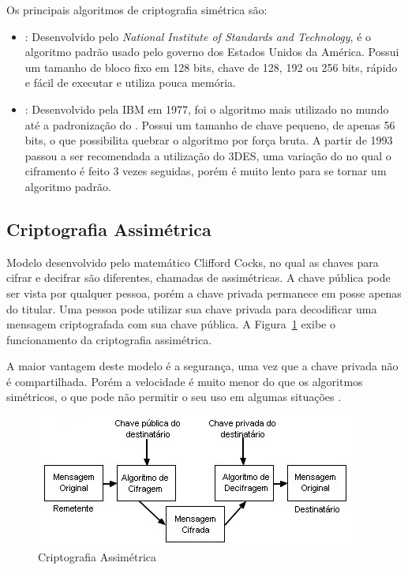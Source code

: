 Os principais algoritmos de criptografia simétrica são:
\begin{itemize}
    \item \aes: Desenvolvido pelo \textit{National Institute of Standards and Technology}, é o algoritmo padrão usado pelo governo dos Estados Unidos da América. Possui um tamanho de bloco fixo em 128 bits, chave de 128, 192 ou 256 bits, rápido e fácil de executar e utiliza pouca memória.
    \item \des: Desenvolvido pela IBM em 1977, foi o algoritmo mais utilizado no mundo até a padronização do \aes. Possui um tamanho de chave pequeno, de apenas 56 bits, o que possibilita quebrar o algoritmo por força bruta. A partir de 1993 passou a ser recomendada a utilização do 3DES, uma variação do \des no qual o ciframento é feito 3 vezes seguidas, porém é muito lento para se tornar um algoritmo padrão.
\end{itemize}

\subsection{Criptografia Assimétrica}

Modelo desenvolvido pelo matemático Clifford Cocks, no qual as chaves para cifrar e decifrar são diferentes, chamadas de assimétricas. A chave pública pode ser vista por qualquer pessoa, porém a chave privada permanece em posse apenas do titular. Uma pessoa pode utilizar sua chave privada para decodificar uma mensagem criptografada com sua chave pública. A Figura~\ref{fig:cripasim} exibe o funcionamento da criptografia assimétrica.

A maior vantagem deste modelo é a segurança, uma vez que a chave privada não é compartilhada. Porém a velocidade é muito menor do que os algoritmos simétricos, o que pode não permitir o seu uso em algumas situações \cite{Stallings2014}.

\begin{figure}[t]
    \centering
    \includegraphics{Images/Assimetrica.jpg}
    \caption{Criptografia Assimétrica}\label{fig:cripasim}
\end{figure}

